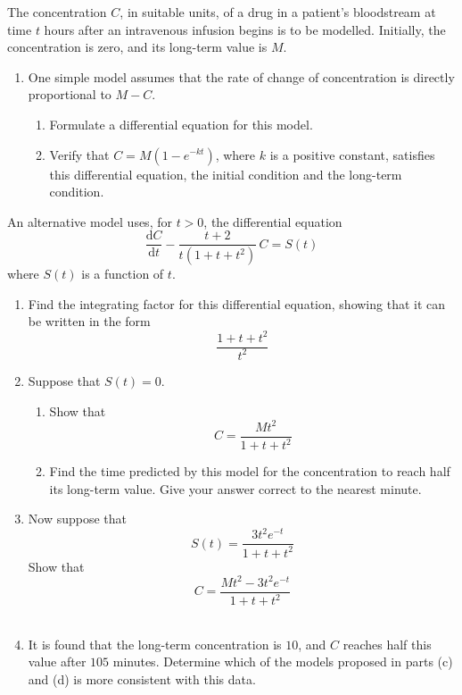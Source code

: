 \documentclass[leqno]{article}
\begin{document}
\begin{enumerate}[
  label=\textbf{\arabic*.},
  leftmargin=*,
  topsep=0pt,
  partopsep=0pt,
  parsep=0pt
]
\newpage

\questionitem

The concentration $C$, in suitable units, of a drug in a patient's bloodstream at time $t$ hours after an intravenous infusion begins is to be modelled. Initially, the concentration is zero, and its long-term value is $M$. \\

\begin{enumerate}[label=\textbf{(\alph*)}]
  \item One simple model assumes that the rate of change of concentration is directly proportional to $M-C$. \\
  \begin{enumerate}[label=(\roman*)]
    \item Formulate a differential equation for this model.  \\
    \item Verify that $C=M(1-e^{-kt})$, where $k$ is a positive constant, satisfies this differential equation, the initial condition and the long-term condition.  \\
  \end{enumerate}
\end{enumerate}
An alternative model uses, for $t>0$, the differential equation
\[
\frac{\mathrm{d}C}{\mathrm{d}t}-\frac{t+2}{t(1+t+t^2)}\,C=S(t)
\]
where $S(t)$ is a function of $t$. \\
\begin{enumerate}[label=\textbf{(\alph*)}, resume]
  \item Find the integrating factor for this differential equation, showing that it can be written in the form
  \[
  \frac{1+t+t^2}{t^2}
  \]
  \item Suppose that $S(t)=0$. \\
  \begin{enumerate}[label=(\roman*)]
    \item Show that
    \[
    C=\frac{Mt^2}{1+t+t^2}
    \]
    \item Find the time predicted by this model for the concentration to reach half its long-term value. Give your answer correct to the nearest minute.  \\
  \end{enumerate}
  \item Now suppose that
  \[
  S(t)=\frac{3t^2 e^{-t}}{1+t+t^2}
  \]
  Show that
  \[
  C=\frac{Mt^2-3t^2 e^{-t}}{1+t+t^2}
  \]  \\
  \item It is found that the long-term concentration is $10$, and $C$ reaches half this value after $105$ minutes. Determine which of the models proposed in parts (c) and (d) is more consistent with this data.  \\
\end{enumerate}
\end{enumerate}
\end{document}
